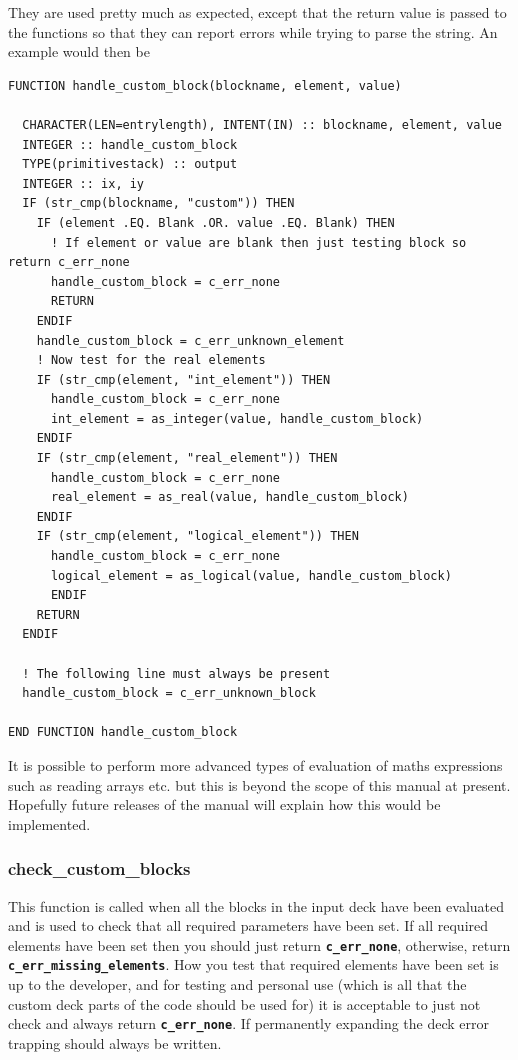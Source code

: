 \documentclass[12pt,a4paper]{article}
\newcommand{\simpleboxverbatim}{\begin{Verbatim}[obeytabs=true,frame=single,
  framerule=0.5mm,rulecolor=\color{warwickmid},formatcom=\color{black}]}
\newcommand{\inlinecode}[1]{{\color{warwickred} \bf\texttt{#1}}}
\begin{document}
They are used pretty much as expected, except that the return value is passed
to the functions so that they can report errors while trying to parse the
string. An example would then be

\simpleboxverbatim
FUNCTION handle_custom_block(blockname, element, value)

  CHARACTER(LEN=entrylength), INTENT(IN) :: blockname, element, value
  INTEGER :: handle_custom_block
  TYPE(primitivestack) :: output
  INTEGER :: ix, iy
  IF (str_cmp(blockname, "custom")) THEN
    IF (element .EQ. Blank .OR. value .EQ. Blank) THEN
      ! If element or value are blank then just testing block so return c_err_none
      handle_custom_block = c_err_none
      RETURN
    ENDIF
    handle_custom_block = c_err_unknown_element
    ! Now test for the real elements
    IF (str_cmp(element, "int_element")) THEN
      handle_custom_block = c_err_none
      int_element = as_integer(value, handle_custom_block)
    ENDIF
    IF (str_cmp(element, "real_element")) THEN
      handle_custom_block = c_err_none
      real_element = as_real(value, handle_custom_block)
    ENDIF
    IF (str_cmp(element, "logical_element")) THEN
      handle_custom_block = c_err_none
      logical_element = as_logical(value, handle_custom_block)
      ENDIF
    RETURN
  ENDIF

  ! The following line must always be present
  handle_custom_block = c_err_unknown_block

END FUNCTION handle_custom_block
\end{Verbatim}

It is possible to perform more advanced types of evaluation of maths
expressions such as reading arrays etc. but this is beyond the scope of this
manual at present. Hopefully future releases of the manual will explain how
this would be implemented.

\subsubsection{check\_custom\_blocks}
This function is called when all the blocks in the input deck have been
evaluated and is used to check that all required parameters have been set. If
all required elements have been set then you should just return
\inlinecode{c\_err\_none}, otherwise, return
\inlinecode{c\_err\_missing\_elements}. How you test that required elements have
been set is up to the developer, and for testing and personal use (which is
all that the custom deck parts of the code should be used for) it is
acceptable to just not check and always return \inlinecode{c\_err\_none}. If
permanently expanding the deck error trapping should always be written.
\end{document}
